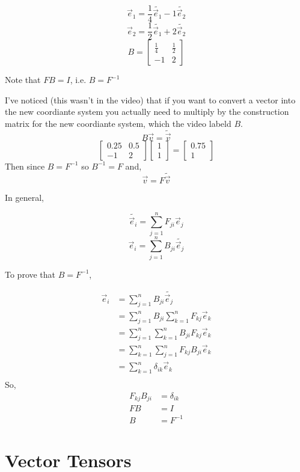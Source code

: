 \documentclass[12pt]{book}
\theoremstyle{plain}
\theoremstyle{definition}
\theoremstyle{ppart}
\theoremstyle{case}
\theoremstyle{solution}
\begin{document}
\[ \vec{e}_1 = \frac{1}{4} \widetilde{\vec{e}_1} - 1 \widetilde{\vec{e}_2} \]
\[ \vec{e}_2 = \frac{1}{2} \widetilde{\vec{e}_1} + 2 \widetilde{\vec{e}_2} \]
\[
  B =
  \begin{bmatrix}
  \frac{1}{4} & \frac{1}{2} \\
  -1 & 2 
  \end{bmatrix}
\]

Note that $FB = I$, i.e. $B = F^{-1}$

I've noticed (this wasn't in the video) that if you want to convert a vector into the new coordiante system you actually
need to multiply by the construction matrix for the new coordiante system, which the video labeld $B$.
\[ B \vec{v} = \widetilde{\vec{v}} \]
\[
  \begin{bmatrix}
  0.25 & 0.5 \\
  -1 & 2 
  \end{bmatrix}
  \begin{bmatrix}
  1 \\
  1
  \end{bmatrix}
  =
  \begin{bmatrix}
  0.75 \\
  1
  \end{bmatrix}
\]
Then since $B = F^{-1}$ so $B^{-1} = F$ and,
\[ \vec{v} = F \widetilde{\vec{v}} \]

In general,

\[ \widetilde{\vec{e}_i} = \sum_{j=1}^{n} F_{ji} \vec{e}_j \]
\[ \vec{e}_i = \sum_{j=1}^{n} B_{ji} \widetilde{\vec{e}_j} \]

To prove that $B = F^{-1}$,

\begin{align*}
  \vec{e}_i &= \sum_{j=1}^{n} B_{ji} \widetilde{\vec{e}_j} \\
  &= \sum_{j=1}^{n} B_{ji} \sum_{k=1}^{n} F_{kj} \vec{e}_k \\
  &= \sum_{j=1}^{n} \sum_{k=1}^{n} B_{ji} F_{kj} \vec{e}_k \\
  &= \sum_{k=1}^{n} \sum_{j=1}^{n} F_{kj} B_{ji} \vec{e}_k \\
  &= \sum_{k=1}^{n} \delta_{ik} \vec{e}_k \\
\end{align*}
So,
\begin{align*}
F_{kj} B_{ji} &= \delta_{ik} \\
FB &= I \\
B &= F^{-1}
\end{align*}

\chapter{Vector Tensors}
\end{document}
